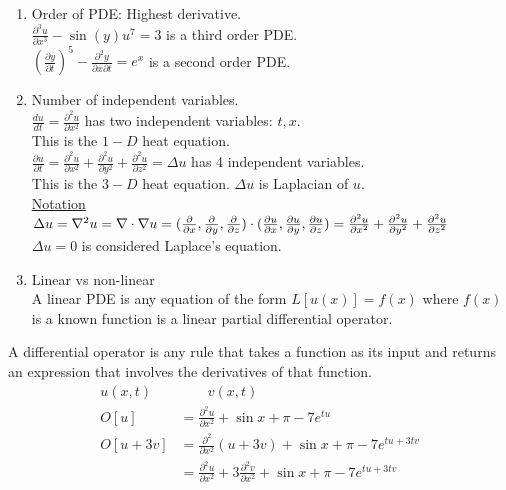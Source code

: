 \documentclass{article}
\begin{document}
\begin{enumerate}
  \item Order of PDE: Highest derivative.\\
  \Ex $\frac{\partial^3 u}{\partial x^3} - \sin(y) u^7 = 3$ is a third order PDE.\\
  \Ex $(\frac{\partial y}{\partial t})^5 - \frac{\partial^2y}{\partial x \partial t} = e^x$ is a second order PDE.
  \item Number of independent variables.\\
  \Ex $\frac{du}{dt} = \frac{\partial^2 u}{\partial x^2}$ has two independent variables: $t, x$.\\
  This is the $1-D$ heat equation.\\
  \Ex $\frac{\partial u}{\partial t} = \frac{\partial^2 u}{\partial x^2} + \frac{\partial^2 u}{\partial y^2} + \frac{\partial^2 u}{\partial z^2} = \Delta u$ has 4 independent variables.\\
  This is the $3-D$ heat equation. $\Delta u$ is Laplacian of $u$.\\
  \underline{Notation}\\
  $
  \Delta u =
  \nabla^2 u =
  \nabla \cdot \nabla u =
  (\frac{\partial}{\partial x}, \frac{\partial}{\partial y}, \frac{\partial}{\partial z}) \cdot (\frac{\partial u}{\partial x}, \frac{\partial u}{\partial y}, \frac{\partial u}{\partial z}) =
  \frac{\partial^2 u}{\partial x^2} + \frac{\partial^2 u}{\partial y^2} + \frac{\partial^2 u}{\partial z^2}
  $\\
  $\Delta u = 0$ is considered Laplace's equation.
  \item Linear vs non-linear\\
  A linear PDE is any equation of the form $L[u(x)] = f(x)$ where $f(x)$ is a known function is a linear partial differential operator.
\end{enumerate}
\dfn A differential operator is any rule that takes a function as its input and returns an expression that involves the derivatives of that function.\\
\Ex
\begin{align}
  u(x, t) & \qquad v(x, t)\\
  O[u] & = \frac{\partial^2 u}{\partial x^2} + \sin x + \pi - 7e^{tu}\\
  O[u + 3v] & = \frac{\partial^2}{\partial x^2}(u + 3v) + \sin x + \pi - 7e^{tu + 3tv}\\
  & = \frac{\partial^2 u}{\partial x^2} + 3 \frac{\partial^2 v}{\partial x^2}+ \sin x + \pi - 7e^{tu + 3tv}
\end{align}
\end{document}

